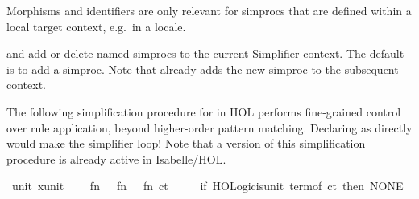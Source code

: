 \begin{isabellebody}
\begin{isamarkuptext}
\begin{description}
  Morphisms and identifiers are only relevant for simprocs that are
  defined within a local target context, e.g.\ in a locale.

  \item {} and 
  add or delete named simprocs to the current Simplifier context.  The
  default is to add a simproc.  Note that \hyperlink{command.simproc-setup}{\mbox{}}
  already adds the new simproc to the subsequent context.

  \end{description}%
\end{isamarkuptext}%
\isamarkuptrue%
%
\isamarkuptrue%
%
\begin{isamarkuptext}%
The following simplification procedure for  in HOL performs fine-grained
  control over rule application, beyond higher-order pattern matching.
  Declaring  as \hyperlink{attribute.simp}{\mbox{}} directly would make
  the simplifier loop!  Note that a version of this simplification
  procedure is already active in Isabelle/HOL.%
\end{isamarkuptext}%
\isamarkuptrue%
%
\isadelimML
%
\endisadelimML
%
\isatagML
{}\isamarkupfalse%
\ unit\ {}{}x{}{}unit{}{}\ {}\ {}\isanewline
\ \ fn\ {}\ {}{}\ fn\ {}\ {}{}\ fn\ ct\ {}{}\isanewline
\ \ \ \ if\ HOLogic{}is{}unit\ {}term{}of\ ct{}\ then\ NONE\isanewline

\end{isabellebody}
